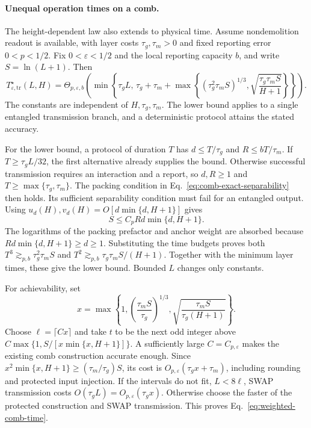 \documentclass[aps,prl,twocolumn,superscriptaddress,longbibliography,reprint,floatfix]{revtex4-2}
\newcommand{\eps}{\varepsilon}
\newcommand{\Topt}{T_{\eps,\mathrm{tr}}^{\star}}
\begin{document}
\paragraph*{Unequal operation times on a comb.}
The height-dependent law also extends to physical time. Assume
nondemolition readout is available, with layer costs $\tau_g,\tau_m>0$
and fixed reporting error $0<p<1/2$. Fix $0<\eps<1/2$ and the local
reporting capacity $b$, and write $S=\ln(L+1)$. Then
\begin{equation}
 \Topt(L,H)=
 \Theta_{p,\eps,b}\!\left(
 \min\left\{\tau_gL,\,
 \tau_g+\tau_m+
 \max\left\{(\tau_g^2\tau_m S)^{1/3},
              \sqrt{\frac{\tau_g\tau_m S}{H+1}}\right\}\right\}
 \right).
 \label{eq:weighted-comb-time}
\end{equation}
The constants are independent of $H,\tau_g,\tau_m$. The lower
bound applies to a single entangled transmission branch, and a
deterministic protocol attains the stated accuracy.

For the lower bound, a protocol of duration $T$ has
$d\le T/\tau_g$ and $R\le bT/\tau_m$.
If $T\ge\tau_gL/32$, the first alternative already supplies the bound.
Otherwise successful transmission requires an interaction and a
report, so $d,R\ge1$ and $T\ge\max\{\tau_g,\tau_m\}$.
The packing condition in Eq.~\eqref{eq:comb-exact-separability}
then holds. Its sufficient separability condition must fail for an
entangled output. Using
$u_d(H),v_d(H)=O[d\min\{d,H+1\}]$ gives
\[
 S\le C_p R d\min\{d,H+1\}.
\]
The logarithms of the packing prefactor and anchor weight are
absorbed because $R d\min\{d,H+1\}\ge d\ge1$.
Substituting the time budgets proves both
$T^3\gtrsim_{p,b}\tau_g^2\tau_m S$ and
$T^2\gtrsim_{p,b}\tau_g\tau_m S/(H+1)$.
Together with the minimum layer times, these give the lower bound.
Bounded $L$ changes only constants.

For achievability, set
\[
 x=\max\left\{1,\left(\frac{\tau_m S}{\tau_g}\right)^{1/3},
                  \sqrt{\frac{\tau_m S}{\tau_g(H+1)}}\right\}.
\]
Choose $\ell=\lceil Cx\rceil$ and take $t$ to be the next odd integer
above $C\max\{1,S/[x\min\{x,H+1\}]\}$.
A sufficiently large $C=C_{p,\eps}$ makes the existing comb
construction accurate enough. Since
$x^2\min\{x,H+1\}\ge(\tau_m/\tau_g)S$,
its cost is $O_{p,\eps}(\tau_gx+\tau_m)$, including rounding
and protected input injection. If the intervals do not fit,
$L<8\ell$, SWAP transmission costs $O(\tau_gL)=O_{p,\eps}(\tau_gx)$.
Otherwise choose the faster of the protected construction and SWAP
transmission. This proves Eq.~\eqref{eq:weighted-comb-time}.
\end{document}
